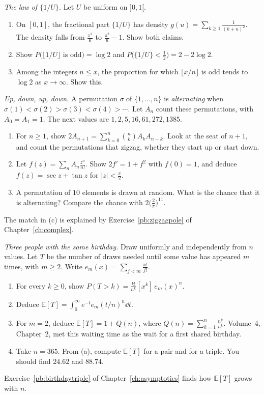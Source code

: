 \begin{exercise}[$\star\star$]\label{pb:quotientlaw}
\emph{The law of $\{1/U\}$.} Let $U$ be uniform on $]0,1[$.
\begin{enumerate}[label=(\alph*)]
\item On $[0,1]$, the fractional part $\{1/U\}$ has density $g(u)=\sum_{k\ge1}\frac1{(k+u)^2}$. The density falls from $\frac{\pi^2}6$ to $\frac{\pi^2}6-1$. Show both claims.
\item Show $P\bigl(\lfloor1/U\rfloor\text{ is odd}\bigr)=\log2$ and $P\bigl(\{1/U\}<\frac12\bigr)=2-2\log2$.
\item Among the integers $n\le x$, the proportion for which $\lfloor x/n\rfloor$ is odd tends to $\log2$ as $x\to\infty$. Show this.
\end{enumerate}
\end{exercise}

\begin{exercise}[$\star\star\star$]\label{pb:zigzag}
\emph{Up, down, up, down.} A permutation $\sigma$ of $\{1,\dots,n\}$ is \emph{alternating} when $\sigma(1)<\sigma(2)>\sigma(3)<\sigma(4)>\cdots$. Let $A_n$ count these
permutations, with $A_0=A_1=1$. The next values are $1,2,5,16,61,272,1385$.
\begin{enumerate}[label=(\alph*)]
\item For $n\ge1$, show $2A_{n+1}=\sum_{k=0}^n\binom nkA_kA_{n-k}$. Look at the seat of $n+1$, and count the permutations that zigzag, whether they start up or start down.
\item Let $f(z)=\sum_nA_n\frac{z^n}{n!}$. Show $2f'=1+f^2$ with $f(0)=1$, and deduce $f(z)=\sec z+\tan z$ for $|z|<\frac\pi2$.
\item A permutation of $10$ elements is drawn at random. What is the chance that it is alternating? Compare the chance with $2\bigl(\frac2\pi\bigr)^{11}$.
\end{enumerate}
The match in (c) is explained by Exercise~\ref{pb:zigzagpole} of Chapter~\ref{ch:complex}.
\end{exercise}

\begin{exercise}[$\star\star$]\label{pb:poissonise}
\emph{Three people with the same birthday.} Draw uniformly and independently from $n$ values. Let $T$ be the number of draws needed
until some value has appeared $m$ times, with $m\ge2$. Write $e_m(x)=\sum_{j<m}\frac{x^j}{j!}$.
\begin{enumerate}[label=(\alph*)]
\item For every $k\ge0$, show $P(T>k)=\frac{k!}{n^k}[x^k]\,e_m(x)^n$.
\item Deduce $\mathbb E[T]=\int_0^\infty e^{-t}e_m(t/n)^n\dd t$.
\item For $m=2$, deduce $\mathbb E[T]=1+Q(n)$, where $Q(n)=\sum_{k=1}^n\frac{n^{\underline k}}{n^k}$. Volume~4, Chapter~2, met this waiting time as the wait for a first shared birthday.
\item Take $n=365$. From (a), compute $\mathbb E[T]$ for a pair and for a triple. You should find $24.62$ and $88.74$.
\end{enumerate}
Exercise~\ref{pb:birthdaytriple} of Chapter~\ref{ch:asymptotics} finds how $\mathbb E[T]$ grows with $n$.
\end{exercise}

